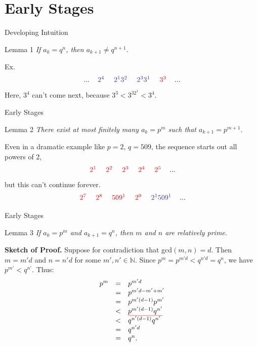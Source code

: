 \documentclass{beamer}
\newcommand{\N}{{\mathbb N}}
\newcommand{\redtext}[1]{{\textcolor{red}{#1}}}
\newcommand{\bluetext}[1]{{\textcolor{dblue}{#1}}}
\newcommand{\remph}[1]{\redtext{\textit{#1}}}
\newcommand{\blemph}[1]{\bluetext{\textit{#1}}}
\def\mathunderline#1#2{\color{#1}\underline{{\color{black}#2}}\color{black}}
\begin{document}
\section{Early Stages}
\begin{frame}{Developing Intuition}%
    
\begin{block}{Lemma 1}
        \textit{If $a_k = q^n$, then $a_{k+1} \neq q^{n+1}$.}
\end{block}
Ex.
\[\begin{array}{ ccccccccccccccc }
... & \blemph{\,$2^4$\,} & \blemph{\,$2^13^2$\,} & \blemph{\,$2^33^1$\,} & \remph{\,$3^3$\,}& ...
\end{array}\]
Here, $3^4$ can't come next, because $3^3<3^32^1<3^4$. 
\end{frame}
\begin{frame}{Early Stages}
    \begin{block}{Lemma 2}
        \textit{There exist at most finitely many $a_k = p^m$ such that $a_{k+1} = p^{m+1}$.}
\end{block}
Even in a dramatic example like $p=2$, $q=509$, the sequence starts out all powers of $2$, 
\[\begin{array}{ ccccccccccccccc }
\remph{\,$2^1$\,} & \remph{\,$2^2$\,} & \remph{\,$2^3$\,} & \remph{\,$2^4$\,} & \remph{\,$2^5$\,} &  ...
\end{array}\]
but this can't continue forever. 
\[\begin{array}{ ccccccccccccccc }
\remph{\,$2^7$\,} & \remph{\,$2^8$\,} & \remph{\,$509^1$\,} & \remph{\,$2^9$\,} &  \blemph{\,$2^1 509^1$\,} & ...
\end{array}\]
\end{frame}
\begin{frame}{Early Stages}
    \begin{block}{Lemma 3}
        \textit{If $a_k = p^m$ and $a_{k+1} = q^n$, then $m$ and $n$ are relatively prime.}
\end{block}

\textbf{Sketch of Proof.} 
    Suppose for contradiction that gcd$(m,n) = d$. Then $m = m'd$ and $n = n'd$ for some $m', n' \in \N$. Since $p^m = p^{m'd} < q^{n'd} = q^n$, we have $p^{m'} < q^{n'}$. Thus:
    \[
    \begin{array}{rcl}
        p^m & = & p^{m'd}\\
        & = & p^{m'd - m' + m'}\\
        & = & p^{m'(d-1)}p^{m'} \\
        & < & \mathunderline{red}{p^{m'(d-1)}q^{n'}} \\
        & < & q^{n'(d-1)}q^{n'} \\
        & = & q^{n'd} \\
        & = & q^n.
    \end{array}
    \]
\end{frame}
\end{document}
